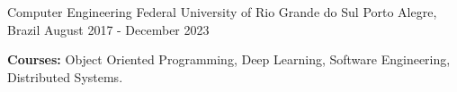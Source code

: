 

\begin{cventries}

    
  \cventry
    {Computer Engineering} %
    {Federal University of Rio Grande do Sul} %
    {Porto Alegre, Brazil} %
    {August 2017 - December 2023} %
    {
      \begin{cvitems} %
        \item {\textbf{Courses:} Object Oriented Programming, Deep Learning, Software Engineering, Distributed Systems.}
      \end{cvitems}
    }
\end{cventries}
